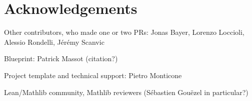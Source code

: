 \documentclass[lean]{DraftAFM}
\begin{document}
\section{Acknowledgements}
Other contributors, who made one or two PRs: Jonas Bayer, Lorenzo Loccioli, Alessio Rondelli, Jérémy Scanvic

Blueprint: Patrick Massot (citation?)

Project template \cite{Monticone_LeanProject_2025} and technical support: Pietro Monticone

Lean/Mathlib community, Mathlib reviewers (Sébastien Gouëzel in particular?)

\printbibliography
\end{document}
